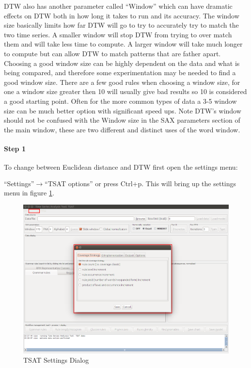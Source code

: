 \documentclass[letterpaper, 12pt]{article}
\begin{document}
DTW also has another parameter called ``Window'' which can have dramatic effects on DTW both in how long it takes to run and its accuracy. The window size basically limits how far DTW will go to try to accurately try to match the two time series. A smaller window will stop DTW from trying to over match them and will take less time to compute. A larger window will take much longer to compute but can allow DTW to match patterns that are father apart. Choosing a good window size can be highly dependent on the data and what is being compared, and therefore some experimentation may be needed to find a good window size. There are a few good rules when choosing a window size, for one a window size greater then 10 will usually give bad results so 10 is considered a good starting point. Often for the more common types of data a 3-5 window size can be much better option with significant speed ups. Note DTW's window should not be confused with the Window size in the SAX parameters section of the main window, these are two different and distinct uses of the word window. 

\newpage
\paragraph{Step 1}
To change between Euclidean distance and DTW first open the settings menu:

``Settings''$\rightarrow$``TSAT options'' or press Ctrl+p. This will bring up the settings menu in figure \ref{fig:TSAT-settings-dialog}.

\begin{figure}[H]
	\includegraphics[width=\textwidth]{TSAT-settings-dialog}
	\caption{TSAT Settings Dialog}
	\label{fig:TSAT-settings-dialog}
\end{figure}
\end{document}
